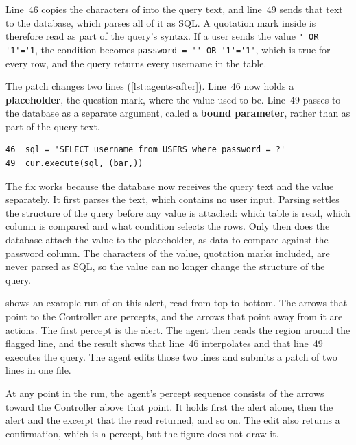 Line~46 copies the characters of  into the query text, and line~49 sends that text to
the database, which parses all of it as SQL. A quotation mark inside  is therefore
read as part of the query's syntax. If a user sends the value
\lstinline[basicstyle=\ttfamily]{' OR '1'='1}, the condition becomes
\lstinline[basicstyle=\ttfamily]{password = '' OR '1'='1'}, which is true for every row, and the
query returns every username in the table.

The patch changes two lines (\cref{lst:agents-after}). Line~46 now holds a \textbf{placeholder},
the question mark, where the value used to be. Line~49 passes  to the database as a
separate argument, called a \textbf{bound parameter}, rather than as part of the query text.

\begin{lstlisting}[basicstyle=\ttfamily\footnotesize,caption={After the fix: the query text holds a placeholder, and the value is passed separately as a bound parameter.},label=lst:agents-after]
46  sql = 'SELECT username from USERS where password = ?'
49  cur.execute(sql, (bar,))
\end{lstlisting}

The fix works because the database now receives the query text and the value separately. It first
parses the text, which contains no user input. Parsing settles the structure of the query before
any value is attached: which table is read, which column is compared and what condition selects the
rows. Only then does the database attach the value to the placeholder, as data to compare against
the password column. The characters of the value, quotation marks included, are never parsed as
SQL, so the value can no longer change the structure of the query.

 shows an example run of \msa{} on this alert, read from top to bottom. The
arrows that point to the Controller are percepts, and the arrows that point away from it are
actions. The first percept is the alert. The agent then reads the region around the flagged line,
and the result shows that line~46 interpolates  and that line~49 executes the query.
The agent edits those two lines and submits a patch of two lines in one file.

At any point in the run, the agent's percept sequence consists of the arrows toward the Controller
above that point. It holds first the alert alone, then the alert and the excerpt that the read
returned, and so on. The edit also returns a confirmation, which is a percept, but the figure does not draw it.

